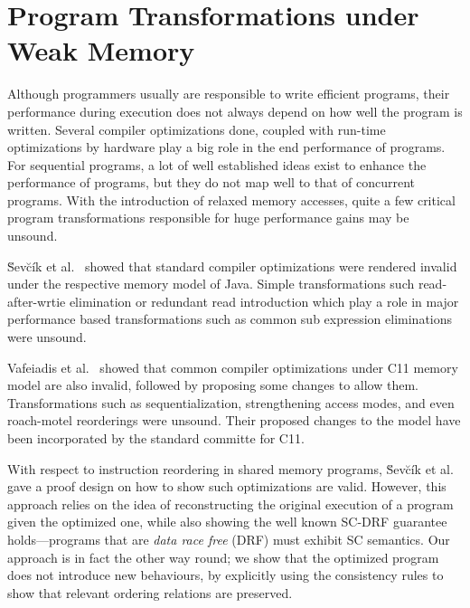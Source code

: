 \section{Program Transformations under Weak Memory}

Although programmers usually are responsible to write efficient programs, their performance during execution does not always depend on how well the program is written. 
Several compiler optimizations done, coupled with run-time optimizations by hardware play a big role in the end performance of programs.
For sequential programs, a lot of well established ideas exist to enhance the performance of programs, but they do not map well to that of concurrent programs. 
With the introduction of relaxed memory accesses, quite a few critical program transformations responsible for huge performance gains may be unsound. 

\u{S}ev\u{c}\'{i}k et al.~\cite{SevcikJ} showed that standard compiler optimizations were rendered invalid under the respective memory model of Java. Simple transformations such read-after-wrtie elimination or redundant read introduction which play a role in major performance based transformations such as common sub expression eliminations were unsound. 

Vafeiadis et al.~\cite{VafeiadisV} showed that common compiler optimizations under C11 memory model are also invalid, followed by proposing some changes to allow them. Transformations such as sequentialization, strengthening access modes, and even roach-motel reorderings were unsound. Their proposed changes to the model have been incorporated by the standard committe for C11. 
   
With respect to instruction reordering in shared memory programs, \u{S}ev\u{c}\'{i}k et al.~\cite{Sevcik2} gave a proof design on how to show such optimizations are valid. However, this approach relies on the idea of reconstructing the original execution of a program given the optimized one, while also showing the well known SC-DRF guarantee holds---programs that are \textit{data race free} (DRF) must exhibit SC semantics. Our approach is in fact the other way round; we show that the optimized program does not introduce new behaviours, by explicitly using the consistency rules to show that relevant ordering relations are preserved.